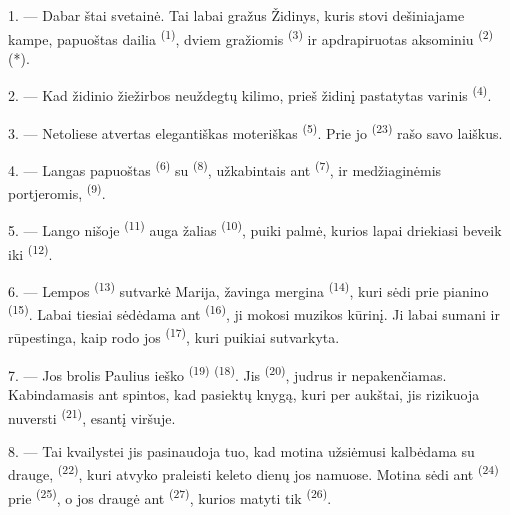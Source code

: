 \VUsaut{5.0mm}
\VUsaut{3.0mm}

1. --- Dabar štai svetainė. Tai labai gražus  Židinys, kuris
stovi dešiniajame kampe, papuoštas dailia  \textsuperscript{(1)},
dviem gražiomis  \textsuperscript{(3)} ir apdrapiruotas aksominiu
 \textsuperscript{(2)} (*).

2. --- Kad židinio žiežirbos neuždegtų kilimo, prieš židinį pastatytas varinis
 \textsuperscript{(4)}.

3. --- Netoliese atvertas elegantiškas moteriškas 
\textsuperscript{(5)}. Prie jo  \textsuperscript{(23)} rašo
savo laiškus.

4. --- Langas papuoštas  \textsuperscript{(6)} su
 \textsuperscript{(8)}, užkabintais ant 
\textsuperscript{(7)}, ir medžiaginėmis portjeromis,  \textsuperscript{(9)}.

5. --- Lango nišoje  \textsuperscript{(11)} auga žalias
 \textsuperscript{(10)}, puiki palmė, kurios lapai driekiasi
beveik iki  \textsuperscript{(12)}.

6. --- Lempos  \textsuperscript{(13)} sutvarkė Marija, žavinga
mergina \textsuperscript{(14)}, kuri sėdi prie pianino \textsuperscript{(15)}. Labai
tiesiai sėdėdama ant  \textsuperscript{(16)}, ji mokosi muzikos
kūrinį. Ji labai sumani ir rūpestinga, kaip rodo jos 
\textsuperscript{(17)}, kuri puikiai sutvarkyta.

\VUsaut{5.0mm}
\VUsaut{3.0mm}

7. --- Jos brolis Paulius ieško  \textsuperscript{(19)}
 \textsuperscript{(18)}. Jis 
\textsuperscript{(20)}, judrus ir nepakenčiamas. Kabindamasis ant spintos, kad
pasiektų knygą, kuri per aukštai, jis rizikuoja nuversti 
\textsuperscript{(21)}, esantį viršuje.

8. --- Tai kvailystei jis pasinaudoja tuo, kad motina užsiėmusi kalbėdama su
drauge,  \textsuperscript{(22)}, kuri atvyko praleisti keleto dienų jos
namuose. Motina sėdi ant  \textsuperscript{(24)} prie 
\textsuperscript{(25)}, o jos draugė ant  \textsuperscript{(27)},
kurios matyti tik  \textsuperscript{(26)}.

